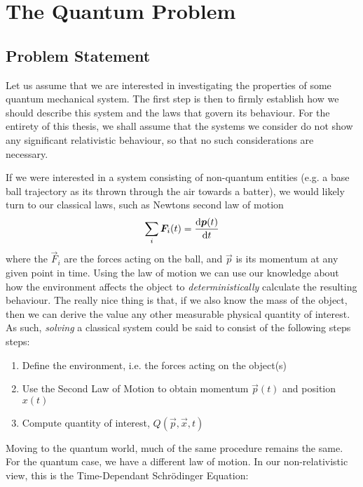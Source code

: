 \documentclass[Thesis.tex]{subfiles}
\begin{document}
\chapter{The Quantum Problem}


\section{Problem Statement}

Let us assume that we are interested in investigating the properties of some quantum
mechanical system. The first step is then to firmly establish how we should describe this
system and the laws that govern its behaviour. For the entirety of this thesis, we shall
assume that the systems we consider do not show any significant relativistic behaviour, so
that no such considerations are necessary.

If we were interested in a system consisting of non-quantum entities (e.g. a base ball
trajectory as its thrown through the air towards a batter), we would likely turn to our
classical laws, such as Newtons second law of motion
%
\begin{align} 
    \sum_i \bm{F}_i(t) = \dv{\bm{p}(t)}{t} 
\end{align}
%
\noindent where the $\vec F_i$ are the forces acting on the ball, and $\vec p$ is its momentum at
any given point in time. Using the law of motion we can use our knowledge about how the
environment affects the object to \emph{deterministically} calculate the resulting
behaviour. The really nice thing is that, if we also know the mass of the object, then we
can derive the value any other measurable physical quantity of interest. As such,
\emph{solving} a classical system could be said to consist of the following steps steps:

\begin{enumerate}
    \item Define the environment, i.e. the forces acting on the object(s)
    \item Use the Second Law of Motion to obtain momentum $\vec p(t)$ and position $x(t)$
    \item Compute quantity of interest, $Q(\vec p, \vec x, t)$
\end{enumerate}

Moving to the quantum world, much of the same procedure remains the same. For the quantum
case, we have a different law of motion. In our non-relativistic view, this is the
Time-Dependant Schrödinger Equation:
\end{document}
